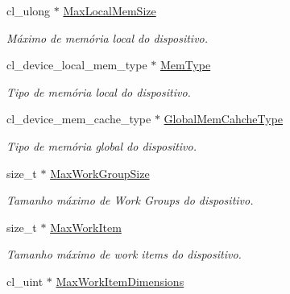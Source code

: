 \begin{DoxyCompactItemize}
cl\+\_\+ulong $\ast$ \hyperlink{structdevices_a55b41f48a237ce3e06b0d5f68f518ae9}{Max\+Local\+Mem\+Size}
\begin{DoxyCompactList}\small\item\em Máximo de memória local do dispositivo. \end{DoxyCompactList}\item 
\hypertarget{structdevices_a0453d0dbf9d90d86ecb62c5cb23cbf5c}{}\label{structdevices_a0453d0dbf9d90d86ecb62c5cb23cbf5c} 
cl\+\_\+device\+\_\+local\+\_\+mem\+\_\+type $\ast$ \hyperlink{structdevices_a0453d0dbf9d90d86ecb62c5cb23cbf5c}{Mem\+Type}
\begin{DoxyCompactList}\small\item\em Tipo de memória local do dispositivo. \end{DoxyCompactList}\item 
\hypertarget{structdevices_a93e65d571bcd11132e2f93ae2f3062ca}{}\label{structdevices_a93e65d571bcd11132e2f93ae2f3062ca} 
cl\+\_\+device\+\_\+mem\+\_\+cache\+\_\+type $\ast$ \hyperlink{structdevices_a93e65d571bcd11132e2f93ae2f3062ca}{Global\+Mem\+Cahche\+Type}
\begin{DoxyCompactList}\small\item\em Tipo de memória global do dispositivo. \end{DoxyCompactList}\item 
\hypertarget{structdevices_a77489d32adab13bba6b5b38f1f4505ee}{}\label{structdevices_a77489d32adab13bba6b5b38f1f4505ee} 
size\+\_\+t $\ast$ \hyperlink{structdevices_a77489d32adab13bba6b5b38f1f4505ee}{Max\+Work\+Group\+Size}
\begin{DoxyCompactList}\small\item\em Tamanho máximo de Work Groups do dispositivo. \end{DoxyCompactList}\item 
\hypertarget{structdevices_aa500c0395fbaacdcfb07c6fb48b09c57}{}\label{structdevices_aa500c0395fbaacdcfb07c6fb48b09c57} 
size\+\_\+t $\ast$ \hyperlink{structdevices_aa500c0395fbaacdcfb07c6fb48b09c57}{Max\+Work\+Item}
\begin{DoxyCompactList}\small\item\em Tamanho máximo de work items do dispositivo. \end{DoxyCompactList}\item 
\hypertarget{structdevices_af3747549c39fc0c0ce1dfe8c9ebf402a}{}\label{structdevices_af3747549c39fc0c0ce1dfe8c9ebf402a} 
cl\+\_\+uint $\ast$ \hyperlink{structdevices_af3747549c39fc0c0ce1dfe8c9ebf402a}{Max\+Work\+Item\+Dimensions}

\end{DoxyCompactItemize}
